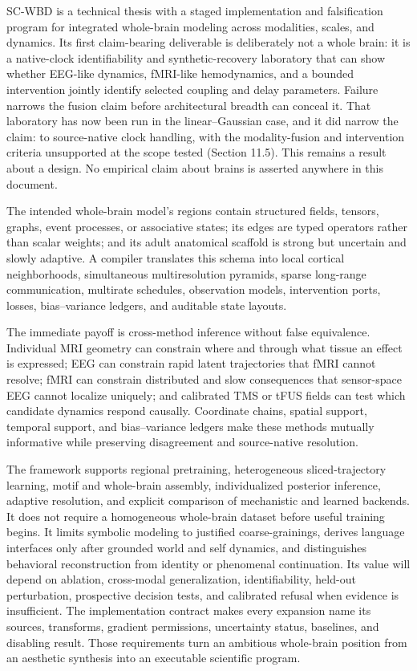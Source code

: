 SC-WBD is a technical thesis with a staged implementation and falsification
program for integrated whole-brain modeling across modalities, scales, and
dynamics. Its first claim-bearing deliverable is deliberately not a whole
brain: it is a native-clock identifiability and synthetic-recovery laboratory
that can show whether EEG-like dynamics, fMRI-like hemodynamics, and a bounded
intervention jointly identify selected coupling and delay parameters. Failure
narrows the fusion claim before architectural breadth can conceal it. That
laboratory has now been run in the linear--Gaussian case, and it did narrow the
claim: to source-native clock handling, with the modality-fusion and
intervention criteria unsupported at the scope tested (Section 11.5). This
remains a result about a design. No empirical claim about brains is asserted
anywhere in this document.

The intended whole-brain model's regions contain structured
fields, tensors, graphs, event processes, or associative states; its edges are
typed operators rather than scalar weights; and its adult anatomical scaffold
is strong but uncertain and slowly adaptive. A compiler translates this
schema into local cortical neighborhoods, simultaneous multiresolution
pyramids, sparse long-range communication, multirate schedules, observation
models, intervention ports, losses, bias--variance ledgers, and auditable state
layouts.

The immediate payoff is cross-method inference without false equivalence.
Individual MRI geometry can constrain where and through what tissue an effect
is expressed; EEG can constrain rapid latent trajectories that fMRI cannot
resolve; fMRI can constrain distributed and slow consequences that sensor-space
EEG cannot localize uniquely; and calibrated TMS or tFUS fields can test which
candidate dynamics respond causally. Coordinate chains, spatial support,
temporal support, and bias--variance ledgers make these methods mutually
informative while preserving disagreement and source-native resolution.

The framework supports regional pretraining, heterogeneous sliced-trajectory
learning, motif and whole-brain assembly, individualized posterior inference,
adaptive resolution, and explicit comparison of mechanistic and learned
backends. It does not require a homogeneous whole-brain dataset before useful
training begins. It limits symbolic modeling to justified coarse-grainings,
derives language interfaces only after grounded world and self dynamics, and
distinguishes behavioral reconstruction from identity or phenomenal
continuation. Its value will depend on ablation, cross-modal generalization,
identifiability, held-out perturbation, prospective decision tests, and
calibrated refusal when evidence is insufficient. The implementation contract
makes every expansion name its sources, transforms, gradient permissions,
uncertainty status, baselines, and disabling result. Those requirements turn
an ambitious whole-brain position from an aesthetic synthesis into an
executable scientific program.
